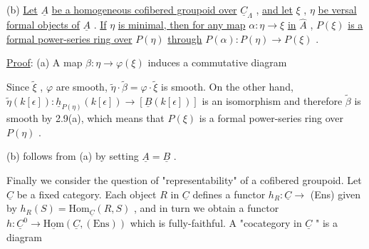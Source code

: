 (b)  \underline{Let} $\underline{A}$ \underline{be a homogeneous cofibered groupoid over} $\underline{C}_{\Lambda}$ , \underline{and let} $\xi$ , $\eta$ \underline{be versal formal objects of} $\underline{A}$ . \underline{If} $\eta$ \underline{is minimal, then for any map} $\alpha : \eta \to \xi$ \underline{in} $\hat{A}$ , $P(\xi)$ \underline{is a formal power-series ring over} $P(\eta)$ \underline{through} $P(\alpha) : P(\eta) \to P(\xi)$ .

\underline{Proof}:  (a)  A map $\beta : \eta \to \varphi(\xi)$ induces a commutative diagram

\begin{center}
\end{center}
Since $\widetilde{\xi}$ , $\varphi$ are smooth, $\widetilde{\eta}\cdot\widetilde{\beta} = \varphi\cdot\widetilde{\xi}$ is smooth. On the other hand,
$\widetilde{\eta}(k[\epsilon]) : \underline{h}_{P(\eta)}(k[\epsilon]) \to [\underline{B}(k[\epsilon])]$ is an isomorphism and therefore $\widetilde{\beta}$ is smooth by 2.9(a), which means that $P(\xi)$ is a formal power-series ring over $P(\eta)$ .

(b)  follows from (a) by setting $\underline{A} = \underline{B}$ .

Finally we consider the question of  "representability"  of a cofibered groupoid. Let $\underline{C}$ be a fixed category. Each object $R$ in $\underline{C}$ defines a functor $h_R : \underline{C} \to$ (Ens)  given by  $h_R(S) = \mathrm{Hom}_{\underline{C}}(R,S)$ , and in turn we obtain a functor $h : \underline{C}^0 \to \underline{\mathrm{Hom}}(\underline{C},(\mathrm{Ens}))$ which is fully-faithful. A  "cocategory in $\underline{C}$ "  is a diagram

